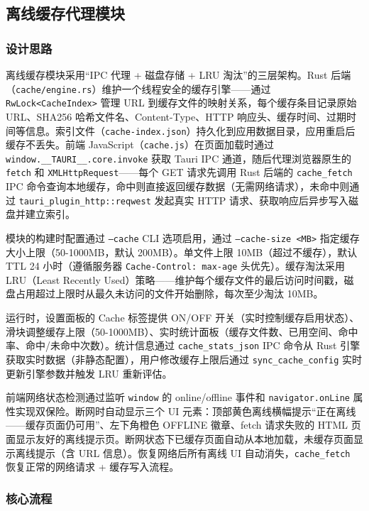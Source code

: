 \documentclass[12pt,a4paper]{ctexart}
\begin{document}
\subsection{离线缓存代理模块}

\subsubsection{设计思路}

离线缓存模块采用``IPC 代理 + 磁盘存储 + LRU 淘汰''的三层架构。Rust 后端（\texttt{cache/engine.rs}）维护一个线程安全的缓存引擎——通过 \texttt{RwLock<CacheIndex>} 管理 URL 到缓存文件的映射关系，每个缓存条目记录原始 URL、SHA256 哈希文件名、Content-Type、HTTP 响应头、缓存时间、过期时间等信息。索引文件（\texttt{cache-index.json}）持久化到应用数据目录，应用重启后缓存不丢失。前端 JavaScript（\texttt{cache.js}）在页面加载时通过 \texttt{window.\_\_TAURI\_\_.core.invoke} 获取 Tauri IPC 通道，随后代理浏览器原生的 \texttt{fetch} 和 \texttt{XMLHttpRequest}——每个 GET 请求先调用 Rust 后端的 \texttt{cache\_fetch} IPC 命令查询本地缓存，命中则直接返回缓存数据（无需网络请求），未命中则通过 \texttt{tauri\_plugin\_http::reqwest} 发起真实 HTTP 请求、获取响应后异步写入磁盘并建立索引。

模块的构建时配置通过 \texttt{--cache} CLI 选项启用，通过 \texttt{--cache-size <MB>} 指定缓存大小上限（50-1000MB，默认 200MB）。单文件上限 10MB（超过不缓存），默认 TTL 24 小时（遵循服务器 \texttt{Cache-Control: max-age} 头优先）。缓存淘汰采用 LRU（Least Recently Used）策略——维护每个缓存文件的最后访问时间戳，磁盘占用超过上限时从最久未访问的文件开始删除，每次至少淘汰 10MB。

运行时，设置面板的 Cache 标签提供 ON/OFF 开关（实时控制缓存启用状态）、滑块调整缓存上限（50-1000MB）、实时统计面板（缓存文件数、已用空间、命中率、命中/未命中次数）。统计信息通过 \texttt{cache\_stats\_json} IPC 命令从 Rust 引擎获取实时数据（非静态配置），用户修改缓存上限后通过 \texttt{sync\_cache\_config} 实时更新引擎参数并触发 LRU 重新评估。

前端网络状态检测通过监听 \texttt{window} 的 online/offline 事件和 \texttt{navigator.onLine} 属性实现双保险。断网时自动显示三个 UI 元素：顶部黄色离线横幅提示``正在离线——缓存页面仍可用''、左下角橙色 OFFLINE 徽章、fetch 请求失败的 HTML 页面显示友好的离线提示页。断网状态下已缓存页面自动从本地加载，未缓存页面显示离线提示（含 URL 信息）。恢复网络后所有离线 UI 自动消失，\texttt{cache\_fetch} 恢复正常的网络请求 + 缓存写入流程。

\subsubsection{核心流程}
\end{document}
